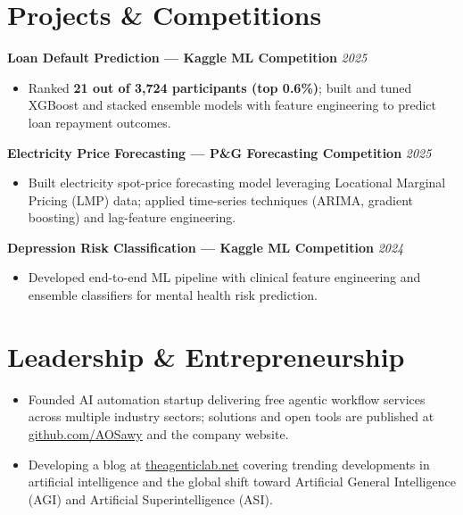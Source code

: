 \documentclass[10pt, letterpaper]{article}
\begin{document}
\section{Projects \& Competitions}

\noindent\textbf{Loan Default Prediction --- Kaggle ML Competition} \hfill \textit{2025}
\begin{itemize}
  \item Ranked \textbf{21 out of 3,724 participants (top 0.6\%)}; built and tuned XGBoost and stacked ensemble models with feature engineering to predict loan repayment outcomes.
\end{itemize}

\vspace{3pt}
\noindent\textbf{Electricity Price Forecasting --- P\&G Forecasting Competition} \hfill \textit{2025}
\begin{itemize}
  \item Built electricity spot-price forecasting model leveraging Locational Marginal Pricing (LMP) data; applied time-series techniques (ARIMA, gradient boosting) and lag-feature engineering.
\end{itemize}

\vspace{3pt}
\noindent\textbf{Depression Risk Classification --- Kaggle ML Competition} \hfill \textit{2024}
\begin{itemize}
  \item Developed end-to-end ML pipeline with clinical feature engineering and ensemble classifiers for mental health risk prediction.
\end{itemize}

\vspace{1pt}

\section{Leadership \& Entrepreneurship}

\begin{itemize}
  \item Founded AI automation startup delivering free agentic workflow services across multiple industry sectors; solutions and open tools are published at \href{https://github.com/AOSawy}{github.com/AOSawy} and the company website.
  \item Developing a blog at \href{https://theagenticlab.net}{theagenticlab.net} covering trending developments in artificial intelligence and the global shift toward Artificial General Intelligence (AGI) and Artificial Superintelligence (ASI).
\end{itemize}
\end{document}
